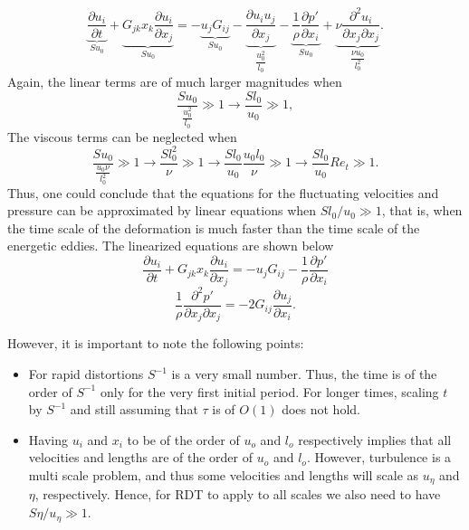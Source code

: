 \documentclass[oneside,a4paper,11pt]{report}
\newcommand{\pfluc}{p'}
\newcommand{\uifluc}{u_i}
\newcommand{\ujfluc}{u_j}
\begin{document}
\begin{equation}
\underbrace{\frac{\partial \uifluc}{\partial t}}_{\displaystyle Su_0} + \underbrace{G_{jk} x_k \frac{\partial \uifluc}{\partial x_j}}_{ \displaystyle Su_0} = -\underbrace{\ujfluc G_{ij}}_{\displaystyle S u_0} - \underbrace{\frac{\partial \uifluc \ujfluc}{\partial x_j}}_{\dfrac{u_0^2}{l_0}} - \underbrace{\frac{1}{\rho} \frac{\partial \pfluc}{\partial x_i}}_{\displaystyle Su_0} + \underbrace{\nu \frac{\partial^2 \uifluc}{\partial x_j \partial x_j}}_{\dfrac{\nu u_0}{l_0^2}}. 
\end{equation}
Again, the linear terms are of much larger magnitudes when
\begin{equation}
\frac{Su_0}{\frac{u_0^2}{l_0}} \gg 1 \to \frac{Sl_0}{u_0} \gg 1,
\end{equation}
The viscous terms can be neglected when
\begin{equation}
\frac{Su_0}{\frac{u_0\nu}{l_0^2}} \gg 1 \to \frac{Sl_0^2}{\nu} \gg 1 \to \frac{Sl_0}{u_0}\frac{u_0l_0}{\nu} \gg 1 \to \frac{Sl_0}{u_0} Re_t \gg 1.
\end{equation}
Thus, one could conclude that the equations for the fluctuating velocities and pressure can be approximated by linear equations when $Sl_0/u_0 \gg 1$, that is, when the time scale of the deformation is much faster than the time scale of the energetic eddies. The linearized equations are shown below
\begin{equation}
\label{ulin}
\frac{\partial \uifluc}{\partial t} + G_{jk}x_k \frac{\partial \uifluc}{\partial x_j} = - \ujfluc G_{ij} -\frac{1}{\rho}\frac{\partial \pfluc}{\partial x_i}
\end{equation}
\begin{equation}
\frac{1}{\rho} \frac{\partial^2 \pfluc}{\partial x_j \partial x_j} = -2G_{ij}\frac{\partial \ujfluc}{\partial x_i}.
\label{plin}
\end{equation}

However, it is important to note the following points:
\begin{itemize}
\item For rapid distortions $S^{-1}$ is a very small number. Thus, the time is of the order of $S^{-1}$ only for the very first initial period. For longer times, scaling $t$ by $S^{-1}$ and still assuming that $\tau$ is of $O(1)$ does not hold.
\item Having $\uifluc$ and $x_i$ to be of the order of $u_o$ and $l_o$ respectively implies that all velocities and lengths are of the order of $u_o$ and $l_o$. However, turbulence is a multi scale problem, and thus some velocities and lengths will scale as $u_\eta$ and $\eta$, respectively. Hence, for RDT to apply to all scales we also need to have $S\eta/u_\eta \gg 1$.
\end{itemize}
\end{document}
